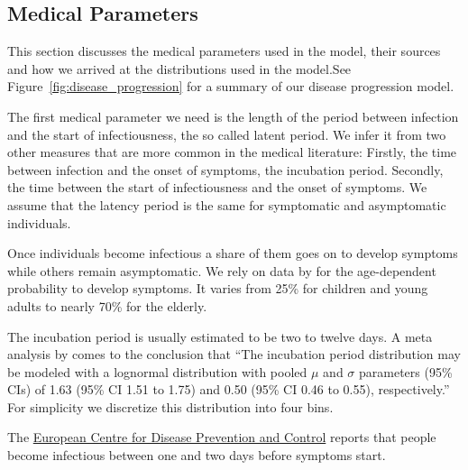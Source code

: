 \subsection{Medical Parameters}
\label{sec:medical_params}

This section discusses the medical parameters used in the model, their sources and how we
arrived at the distributions used in the model.\footnotemark See
Figure~\ref{fig:disease_progression} for a summary of our disease progression model.



The first medical parameter we need is the length of the period between infection and the
start of infectiousness, the so called latent period. We infer it from two other measures
that are more common in the medical literature: Firstly, the time between infection and
the onset of symptoms, the incubation period. Secondly, the time between the start of
infectiousness and the onset of symptoms. We assume that the latency period is the same
for symptomatic and asymptomatic individuals.

Once individuals become infectious a share of them goes on to develop symptoms while
others remain asymptomatic. We rely on data by \cite{Davies2020} for the age-dependent
probability to develop symptoms. It varies from 25\% for children and young adults to
nearly 70\% for the elderly.

The incubation period is usually estimated to be two to twelve days. A meta analysis by
\citet{McAloon2020} comes to the conclusion that ``The incubation period distribution may
be modeled with a lognormal distribution with pooled $\mu$ and $\sigma$ parameters (95\%
CIs) of 1.63 (95\% CI 1.51 to 1.75) and 0.50 (95\% CI 0.46 to 0.55), respectively.'' For
simplicity we discretize this distribution into four bins.

The \href{https://bit.ly/3pi18Ax}{European Centre for Disease Prevention and Control}
reports that people become infectious between one and two days before symptoms
start.\footnotemark


